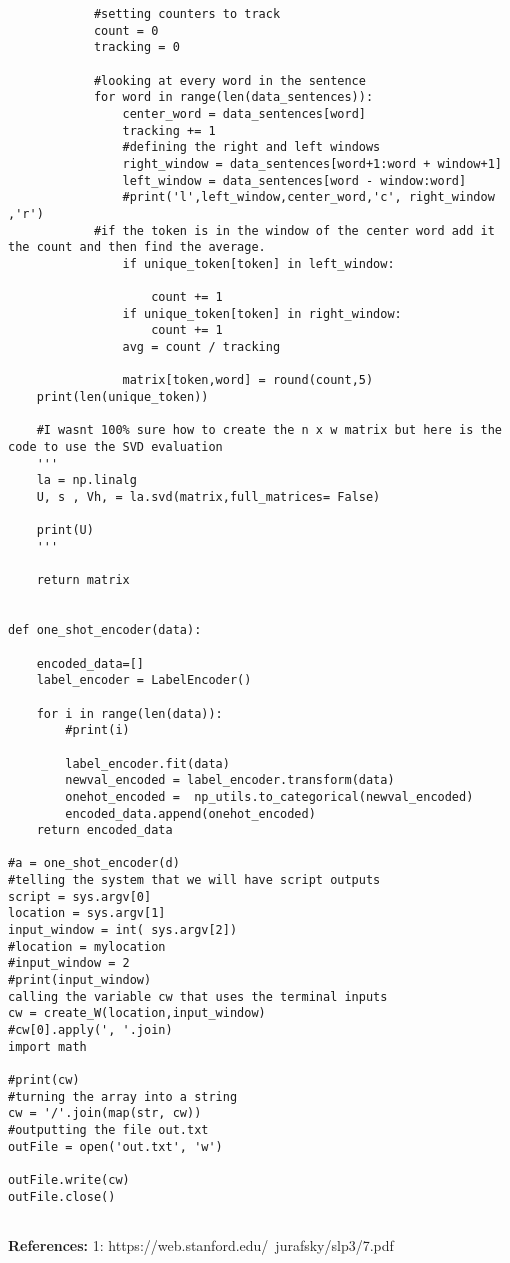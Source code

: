 \documentclass[12pt,a4paper]{report}
\begin{document}
\begin{lstlisting}
            #setting counters to track
            count = 0
            tracking = 0

            #looking at every word in the sentence
            for word in range(len(data_sentences)):
                center_word = data_sentences[word]
                tracking += 1
				#defining the right and left windows
                right_window = data_sentences[word+1:word + window+1]
                left_window = data_sentences[word - window:word]
                #print('l',left_window,center_word,'c', right_window ,'r')
			#if the token is in the window of the center word add it the count and then find the average.
                if unique_token[token] in left_window:

                    count += 1
                if unique_token[token] in right_window:
                    count += 1
                avg = count / tracking

                matrix[token,word] = round(count,5)
    print(len(unique_token))
    
    #I wasnt 100% sure how to create the n x w matrix but here is the code to use the SVD evaluation
    ''' 
    la = np.linalg
    U, s , Vh, = la.svd(matrix,full_matrices= False)

    print(U)
    '''
   
    return matrix


def one_shot_encoder(data):

    encoded_data=[]
    label_encoder = LabelEncoder()

    for i in range(len(data)):
        #print(i)

        label_encoder.fit(data)
        newval_encoded = label_encoder.transform(data)
        onehot_encoded =  np_utils.to_categorical(newval_encoded)
        encoded_data.append(onehot_encoded)
    return encoded_data
    
#a = one_shot_encoder(d)
#telling the system that we will have script outputs 
script = sys.argv[0]
location = sys.argv[1]
input_window = int( sys.argv[2])
#location = mylocation
#input_window = 2
#print(input_window)
calling the variable cw that uses the terminal inputs
cw = create_W(location,input_window)
#cw[0].apply(', '.join)
import math

#print(cw)
#turning the array into a string
cw = '/'.join(map(str, cw))
#outputting the file out.txt
outFile = open('out.txt', 'w')

outFile.write(cw)
outFile.close()


\end{lstlisting}
\textbf{References:}
1: https://web.stanford.edu/~jurafsky/slp3/7.pdf \\
\end{document}
